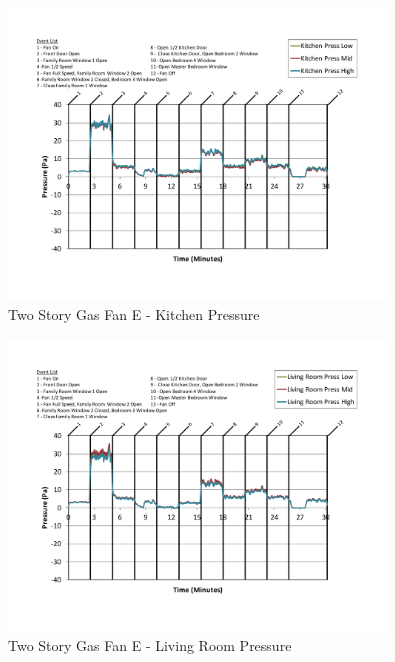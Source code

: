 \documentclass{article}
\begin{document}
\begin{appendices}
	\begin{figure}[H]
		\centering
		\includegraphics[height=3.05in,trim=0.67in 1.1in 0.67in 0.8in,clip=true]{0_Images/Results_Charts/ColdFlow/Two_Story/Gas/E/Kitchen_Pressure.pdf}
		\caption{Two Story Gas Fan E - Kitchen Pressure}
	\end{figure}
 

	\begin{figure}[H]
		\centering
		\includegraphics[height=3.05in,trim=0.67in 1.1in 0.67in 0.8in,clip=true]{0_Images/Results_Charts/ColdFlow/Two_Story/Gas/E/Living_Room_Pressure.pdf}
		\caption{Two Story Gas Fan E - Living Room Pressure}
	\end{figure}
 
	\clearpage


\end{appendices}
\end{document}
